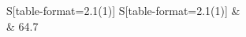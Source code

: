 \begin{tabular}{S[table-format=2.1(1)] S[table-format=2.1(1)]}
\toprule
{} & \\
  & 64.7  \\
\bottomrule
\end{tabular}